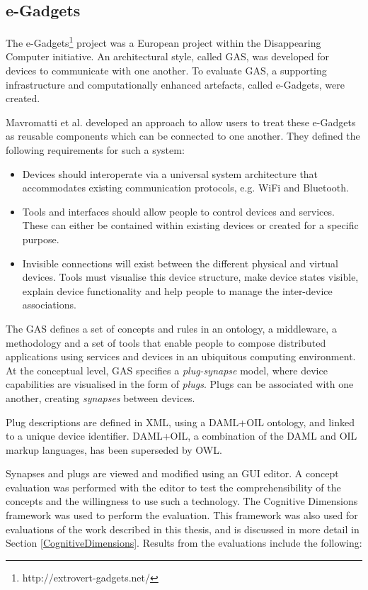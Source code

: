 \subsection{e-Gadgets}
\label{egadgets}

The e-Gadgets\footnote{http://extrovert-gadgets.net/} project was a European project within the Disappearing Computer initiative. An architectural style, called \ac{GAS}, was developed for devices to communicate with one another. To evaluate \ac{GAS}, a supporting infrastructure and computationally enhanced artefacts, called e-Gadgets, were created.

Mavromatti et al. \cite{Mavrommati2004} developed an approach to allow users to treat these e-Gadgets as reusable components which can be connected to one another. They defined the following requirements for such a system:

\begin{itemize}
	\item Devices should interoperate via a universal system architecture that accommodates existing communication protocols, e.g. WiFi and Bluetooth.
	\item Tools and interfaces should allow people to control devices and services. These can either be contained within existing devices or created for a specific purpose.
	\item Invisible connections will exist between the different physical and virtual devices. Tools must visualise this device structure, make device states visible, explain device functionality and help people to manage the inter-device associations.
\end{itemize}

The \ac{GAS} defines a set of concepts and rules in an ontology, a middleware, a methodology and a set of tools that enable people to compose distributed applications using services and devices in an ubiquitous computing environment. At the conceptual level, \ac{GAS} specifies a \emph{plug-synapse} model, where device capabilities are visualised in the form of \emph{plugs}. Plugs can be associated with one another, creating \emph{synapses} between devices.

Plug descriptions are defined in \ac{XML}, using a DAML+OIL ontology, and linked to a unique device identifier. DAML+OIL, a combination of the \ac{DAML} and \ac{OIL} markup languages, has been superseded by \ac{OWL}. 

Synapses and plugs are viewed and modified using an \ac{GUI} editor. A concept evaluation was performed with the editor to test the comprehensibility of the concepts and the willingness to use such a technology. The Cognitive Dimensions framework was used to perform the evaluation. This framework was also used for evaluations of the work described in this thesis, and is discussed in more detail in Section \ref{CognitiveDimensions}. Results from the evaluations include the following:

